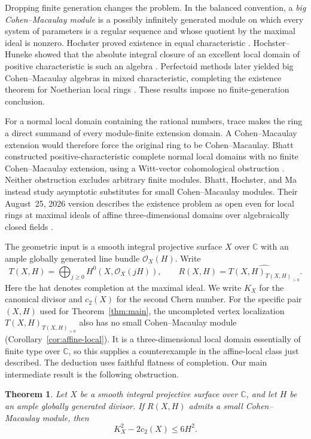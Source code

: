 \documentclass[11pt]{article}
\newtheorem{theorem}{Theorem}[section]
\theoremstyle{remark}
\newcommand{\C}{\mathbb C}
\newcommand{\cO}{\mathcal O}
\begin{document}
Dropping finite generation changes the problem. In the balanced convention,
a \emph{big Cohen--Macaulay module} is a possibly infinitely generated
module on which every system of parameters is a regular sequence and whose
quotient by the maximal ideal is nonzero. Hochster proved existence in
equal characteristic \cite{Hochster1975}. Hochster--Huneke showed that
the absolute integral closure of an excellent local domain of positive
characteristic is such an algebra \cite{HochsterHuneke1992}. Perfectoid
methods later yielded big Cohen--Macaulay algebras in mixed characteristic,
completing the existence theorem for Noetherian local rings
\cite[Theorem~0.7.1]{Andre2018}. These results impose no finite-generation
conclusion.

For a normal local domain containing the rational numbers, trace makes
the ring a direct summand of every module-finite extension domain. A
Cohen--Macaulay extension would therefore force the original ring to be
Cohen--Macaulay. Bhatt constructed positive-characteristic complete normal
local domains with no finite Cohen--Macaulay extension, using a Witt-vector
cohomological obstruction \cite{Bhatt2014}. Neither obstruction excludes
arbitrary finite modules. Bhatt, Hochster, and Ma instead study asymptotic
substitutes for small Cohen--Macaulay modules. Their August~25, 2026 version
describes the existence problem as open even for local rings at maximal
ideals of affine three-dimensional domains over algebraically closed
fields \cite[Sections~1.1 and 1.3]{BhattHochsterMa}.

The geometric input is a smooth integral projective surface $X$ over $\C$
with an ample
globally generated line bundle $\cO_X(H)$. Write
\[
 T(X,H)=\bigoplus_{j\geq0}H^0(X,\cO_X(jH)),\qquad
 R(X,H)=\widehat{T(X,H)_{T(X,H)_{>0}}}.
\]
Here the hat denotes completion at the maximal ideal. We write $K_X$ for
the canonical divisor and $c_2(X)$ for the second Chern number.
For the specific pair $(X,H)$ used for Theorem~\ref{thm:main}, the
uncompleted vertex localization $T(X,H)_{T(X,H)_{>0}}$ also has no small
Cohen--Macaulay module (Corollary~\ref{cor:affine-local}). It is a
three-dimensional local domain essentially of finite type over $\C$, so
this supplies a counterexample in the affine-local class just described.
The deduction uses faithful flatness of completion.
Our main intermediate result is the following obstruction.

\begin{theorem}\label{thm:obstruction}
Let $X$ be a smooth integral projective surface over $\C$, and let $H$ be
an ample globally generated divisor. If $R(X,H)$ admits a small
Cohen--Macaulay module, then
\begin{equation}\label{eq:obstruction}
 K_X^2-2c_2(X)\leq 6H^2.
\end{equation}
\end{theorem}
\end{document}
